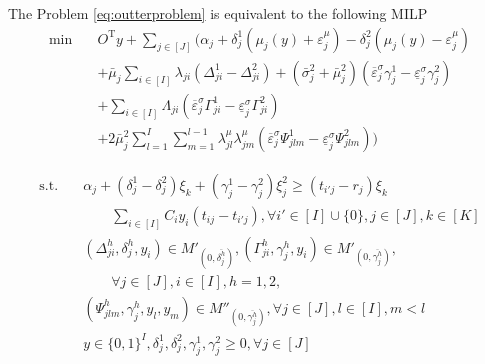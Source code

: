 \documentclass{beamer}
\newcommand{\T}{\mathrm{T}}
\begin{document}
\begin{frame}[allowframebreaks]
	\begin{theorem}
		The Problem \ref{eq:outterproblem} is equivalent to the following MILP
		\begin{align*}
			\min \quad& O^\T y + \sum_{j \in [J]}\Big(\alpha_j + \delta_j^1 \left(\mu_j(y) + \varepsilon_j^\mu\right) - \delta_j^2 \left(\mu_j(y) - \varepsilon_j^\mu\right) \\
			& + \bar{\mu}_j \sum_{i \in [I]} \lambda_{j i} (\Delta_{ji}^1 - \Delta_{ji}^2) + (\bar{\sigma}_j^2 + \bar{\mu}_j^2)(\overline{\varepsilon}_j^\sigma \gamma_j^1 - \underline{\varepsilon}_j^\sigma \gamma_j^2) \\
			& + \sum_{i \in [I]} \Lambda_{j i} (\overline{\varepsilon}_j^\sigma \Gamma_{ji}^1 -\underline{\varepsilon}_j^\sigma \Gamma_{ji}^2) \\
			& + 2 \bar{\mu}_j^2 \sum_{l=1}^{I} \sum_{m=1}^{l-1}\lambda_{j l}^\mu \lambda_{j m}^\mu (\overline{\varepsilon}_j^\sigma \Psi_{jlm}^1 - \underline{\varepsilon}_j^\sigma \Psi_{jlm}^2)\Big)
		\end{align*}
	\end{theorem}
	
	\framebreak
	\begin{theorem}
		\begin{align*}
			\text{s.t.} \quad& \alpha_j + (\delta_j^1 - \delta_j^2) \xi_k + (\gamma_j^1 - \gamma_j^2) \xi_j^2 \ge (t_{i'j} - r_j) \xi_k \\
			&\qquad \sum_{i \in [I]} C_i y_i (t_{ij} - t_{i'j}), \forall i' \in [I] \cup \{0\}, j \in [J], k \in [K] \\
			& (\Delta_{ji}^h, \delta_j^h, y_i) \in M'_{(0, \overline{\delta_j^h})}, (\Gamma_{ji}^h, \gamma_j^h, y_i) \in M'_{(0, \overline{\gamma_j^h})}, \\
			&\qquad \forall j \in [J], i \in [I], h = 1, 2, \\
			&(\Psi_{jlm}^h, \gamma_j^h, y_l, y_m) \in M''_{(0, \overline{\gamma_j^h})}, \forall j \in [J], l \in [I], m < l \\
			& y \in \{0, 1\}^I, \delta_j^1, \delta_j^2, \gamma_j^1, \gamma_j^2 \ge 0, \forall j \in [J]
		\end{align*}
	\end{theorem}
\end{frame}
\end{document}
